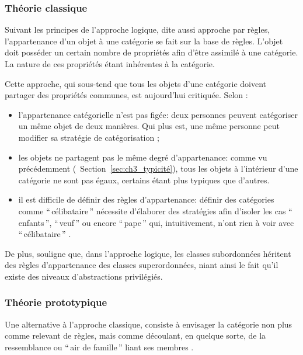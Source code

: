 \subsubsection{Théorie classique}

Suivant les principes de l'approche logique, dite aussi approche par règles, l'appartenance d'un objet à une catégorie se fait sur la base de règles. L'objet doit posséder un certain nombre de propriétés afin d'être assimilé à une catégorie. La nature de ces propriétés étant inhérentes à la catégorie.

Cette approche, qui sous-tend que tous les objets d'une catégorie doivent partager des propriétés communes, est aujourd'hui critiquée. Selon \citep{goldstone2003concepts}:

\begin{itemize}
\item l'appartenance catégorielle n'est pas figée: deux personnes peuvent catégoriser un même objet de deux manières. Qui plus est, une même personne peut modifier sa stratégie de catégorisation \citep{mccloskey1978natural};
\item les objets ne partagent pas le même degré d'appartenance: comme vu précédemment (\cf~Section~\ref{sec:ch3_typicité}), tous les objets à l'intérieur d'une catégorie ne sont pas égaux, certains étant plus typiques que d'autres.
\item il est difficile de définir des règles d'appartenance: définir des catégories comme ``\,célibataire\,'' nécessite d'élaborer des stratégies afin d'isoler les cas ``\,enfants\,'', ``\,veuf\,'' ou encore ``\,pape\,'' qui, intuitivement, n'ont rien à voir avec ``\,célibataire\,'' . 
\end{itemize}

De plus, \citep[49]{Houix03f} souligne que, dans l'approche logique, les classes subordonnées héritent des règles d'appartenance des classes superordonnées, niant ainsi le fait qu'il existe des niveaux d'abstractions privilégiés. 

\subsubsection{Théorie prototypique}

Une alternative à l'approche classique, consiste à envisager la catégorie non plus comme relevant de règles, mais comme découlant, en quelque sorte, de la ressemblance ou ``\,air de famille\,'' liant ses membres \citep{ludwig1953philosophical}.

